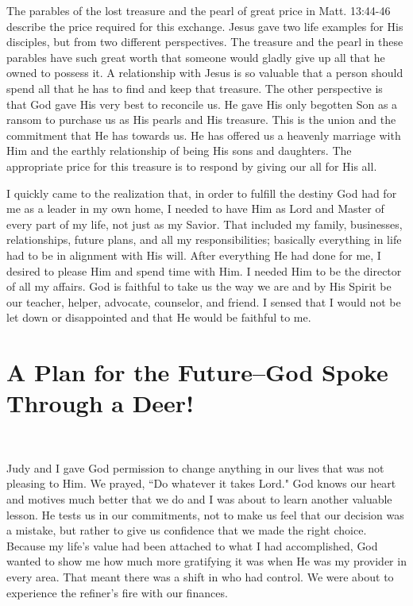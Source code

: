 \documentclass[oneside]{book}
\begin{document}
The parables of the lost treasure and the pearl of great price in Matt. 13:44-46 describe the price required for this exchange. Jesus gave two life examples for His disciples, but from two different perspectives. The treasure and the pearl in these parables have such great worth that someone would gladly give up all that he owned to possess it. A relationship with Jesus is so valuable that a person should spend all that he has to find and keep that treasure. The other perspective is that God gave His very best to reconcile us. He gave His only begotten Son as a ransom to purchase us as His pearls and His treasure. This is the union and the commitment that He has towards us. He has offered us a heavenly marriage with Him and the earthly relationship of being His sons and daughters. The appropriate price for this treasure is to respond by giving our all for His all.

I quickly came to the realization that, in order to fulfill the destiny God had for me as a leader in my own home, I needed to have Him as Lord and Master of every part of my life, not just as my Savior. That included my family, businesses, relationships, future plans, and all my responsibilities; basically everything in life had to be in alignment with His will. After everything He had done for me, I desired to please Him and spend time with Him. I needed Him to be the director of all my affairs. God is faithful to take us the way we are and by His Spirit be our teacher, helper, advocate, counselor, and friend. I sensed that I would not be let down or disappointed and that He would be faithful to me.


\chapter{A Plan for the Future--God Spoke Through a Deer!}
\

Judy and I gave God permission to change anything in our lives that was not pleasing to Him. We prayed, ``Do whatever it takes Lord." God knows our heart and motives much better that we do and I was about to learn another valuable lesson. He tests us in our commitments, not to make us feel that our decision was a mistake, but rather to give us confidence that we made the right choice. Because my life's value had been attached to what I had accomplished, God wanted to show me how much more gratifying it was when He was my provider in every area. That meant there was a shift in who had control. We were about to experience the refiner's fire with our finances.
\end{document}

